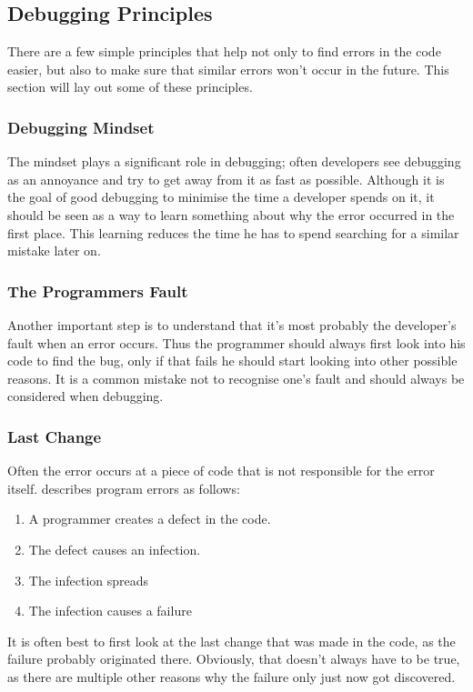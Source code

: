 \subsection{Debugging Principles}

There are a few simple principles that help not only to find errors in the code easier, but also to make sure that similar errors won't occur in the future. This section will lay out some of these principles.

\subsubsection{Debugging Mindset}
The mindset plays a significant role in debugging; often developers see debugging as an annoyance and try to get away from it as fast as possible. Although it is the goal of good debugging to minimise the time a developer spends on it, it should be seen as a way to learn something about why the error occurred in the first place. This learning reduces the time he has to spend searching for a similar mistake later on.

\subsubsection{The Programmers Fault}
Another important step is to understand that it's most probably the developer's fault when an error occurs. Thus the programmer should always first look into his code to find the bug, only if that fails he should start looking into other possible reasons. It is a common mistake not to recognise one's fault and should always be considered when debugging.

\subsubsection{Last Change}
Often the error occurs at a piece of code that is not responsible for the error itself. \cite{Zeller:2009:WPF:1718010} describes program errors as follows:
\begin{enumerate}
  \item A programmer creates a defect in the code.
  \item The defect causes an infection.
  \item The infection spreads
  \item The infection causes a failure
\end{enumerate}

It is often best to first look at the last change that was made in the code, as the failure probably originated there. Obviously, that doesn't always have to be true, as there are multiple other reasons why the failure only just now got discovered.

